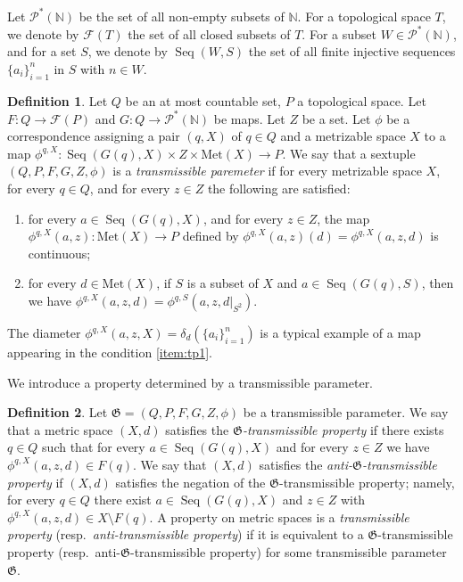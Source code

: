 \documentclass[a4paper, 12pt]{amsart}
\theoremstyle{plain}
\theoremstyle{definition}
\newtheorem{df}{Definition}[section]
\theoremstyle{remark}
\newcommand{\nn}{\mathbb{N}}
\DeclareMathOperator{\seq}{Seq}
\newcommand{\met}[1]{\mathrm{Met}(#1)}
\begin{document}
Let  
$\mathcal{P}^*(\nn)$ 
be  the set of all non-empty subsets of  
$\nn$. 
For a  topological space 
$T$, 
we denote by 
$\mathcal{F}(T)$ 
the set of all closed subsets of 
$T$. 
For a subset 
$W\in \mathcal{P}^*(\nn)$, 
and for a  set 
$S$, 
we denote by 
$\seq(W, S)$ 
the set of all finite injective sequences 
$\{a_i\}_{i=1}^n$ 
in  
$S$ with 
$n\in W$. 



\begin{df}\label{def:transp}
Let 
$Q$ 
be an at most countable set, 
$P$ 
a topological space. 
Let 
$F: Q\to \mathcal{F}(P)$ 
and 
$G: Q\to \mathcal{P}^*(\nn)$ 
be maps.
Let 
$Z$ 
be a set.  
Let 
$\phi$ 
be a correspondence 
assigning a pair 
$(q, X)$  of 
$q\in Q$ 
and a metrizable space 
$X$ 
to a map 
$\phi^{q, X}:\seq(G(q), X)\times Z\times \met{X} \to P$. 
We say that 
a sextuple 
$(Q, P, F, G, Z, \phi)$ 
is 
a \emph{transmissible paremeter}
if 
for every metrizable space 
$X$, 
for every $q\in Q$, 
and
 for every 
 $z\in Z$  
 the following are satisfied:
\begin{enumerate}[label=\textup{(TP\arabic*)}]


	\item\label{item:tp1}
	for every 
	$a\in \seq(G(q), X)$, 
	and for every 
	$z\in Z$, 
	the map 
	$\phi^{q, X}(a, z):\met{X}\to P$ 
	defined by 
	$\phi^{q, X}(a, z)(d)=\phi^{q, X}(a, z, d)$ 
	is continuous; 
	
	
	
	\item\label{item:tp2}
	 for every  
	 $d\in \met{X}$, 
	if  $S$ is a subset of $X$ and 
	$a\in \seq(G(q), S)$, 
	 then we have 
	$\phi^{q, X}(a, z, d)=\phi^{q, S}(a, z, d|_{S^2})$. 
	\end{enumerate}
\end{df}
The diameter 
$\phi^{q, X}(a, z, X)=\delta_{d}(\{a_{i}\}_{i=1}^{n})$ is a typical example 
of  a map appearing in  
the condition \ref{item:tp1}. 


We introduce a property determined by a transmissible parameter. 
\begin{df}
Let 
$\mathfrak{G}=(Q, P, F, G, Z, \phi)$ 
be a transmissible parameter. 
We say that a metric space 
$(X, d)$ 
satisfies 
the 
\emph{$\mathfrak{G}$-transmissible  property} 
if 
there exists  
$q\in Q$ 
such that 
for every 
$a\in \seq(G(q), X)$ 
and for every 
$z\in Z$ 
we have 
$\phi^{q, X}(a, z, d)\in F(q)$. 
We say that 
$(X, d)$ 
satisfies the 
\emph{anti-$\mathfrak{G}$-transmissible property} 
if 
$(X, d)$  
satisfies the negation of the 
$\mathfrak{G}$-transmissible property; 
namely, 
for every 
$q\in Q$ 
there exist 
$a\in \seq(G(q), X)$ 
and 
$z\in Z$ 
with 
$\phi^{q, X}(a, z, d)\in X\setminus F(q)$. 
A property on metric spaces is  a 
\emph{transmissible property} (resp.~\emph{anti-transmissible property})
if it is equivalent to a 
$\mathfrak{G}$-transmissible property 
(resp.~anti-$\mathfrak{G}$-transmissible property) 
for some
transmissible parameter 
$\mathfrak{G}$. 
\end{df}
\end{document}
